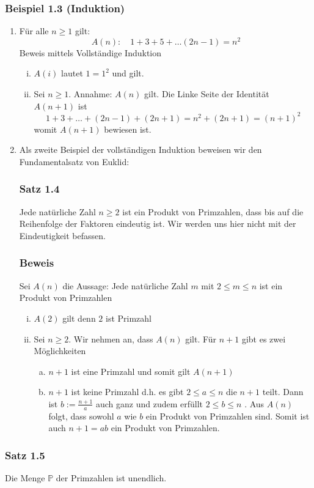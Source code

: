 \subsubsection*{Beispiel 1.3 (Induktion)}
\begin{enumerate}
\item Für alle $n\geq 1$ gilt: \[A(n): \quad 1+3+5+\dots (2n-1)=n^2\] Beweis mittels Vollständige Induktion
\begin{enumerate}[i)]
\item $A(i)$ lautet $1=1^2$ und gilt.
\item Sei $n\geq 1$. Annahme: $A(n)$ gilt. Die Linke Seite der Identität $A(n+1)$ ist \[1+3+\dots +(2n-1)+(2n+1)=n^{2}+(2n+1)=(n+1)^2\] womit $A(n+1)$ bewiesen ist.
\end{enumerate}
\item Als zweite Beispiel der vollständigen Induktion beweisen wir den Fundamentalsatz von Euklid:
\subsubsection*{Satz 1.4}
Jede natürliche Zahl $n\geq 2$ ist ein Produkt von Primzahlen, dass bis auf die Reihenfolge der Faktoren eindeutig ist. Wir werden uns hier nicht mit der Eindeutigkeit befassen.
\subsubsection*{Beweis}
Sei $A(n)$ die Aussage: Jede natürliche Zahl $m$ mit $2\leq m\leq n$ ist ein Produkt von Primzahlen
\begin{enumerate}[i)]
\item $A(2)$ gilt denn $2$ ist Primzahl
\item Sei $n\geq 2$. Wir nehmen an, dass $A(n)$ gilt. Für $n+1$ gibt es zwei Möglichkeiten
\begin{enumerate}[a)]
\item $n+1$ ist eine Primzahl und somit gilt $A(n+1)$ 
\item $n+1$ ist keine Primzahl d.h. es gibt $2\leq a\leq n$ die $n+1$ teilt. Dann ist $b:=\frac{n+1}{a}$ auch ganz und zudem erfüllt $2\leq b\leq n$ . Aus $A(n)$ folgt, dass sowohl $a$ wie $b$ ein Produkt von Primzahlen sind. Somit ist auch $n+1=ab$ ein Produkt von Primzahlen. 
\end{enumerate}
\end{enumerate}
\end{enumerate}
\subsubsection*{Satz 1.5}
Die Menge $\mathbb{P}$ der Primzahlen ist unendlich.
